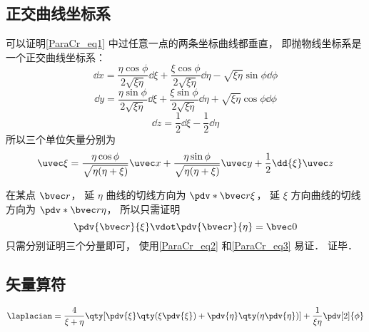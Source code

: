\subsection{正交曲线坐标系}
可以证明\autoref{ParaCr_eq1} 中过任意一点的两条坐标曲线都垂直， 即抛物线坐标系是一个正交曲线坐标系：
\begin{equation}
\dd{x} = \frac{\eta \cos\phi}{2\sqrt{\xi\eta}}\dd{\xi} + \frac{\xi \cos\phi}{2\sqrt{\xi\eta}}\dd{\eta} - \sqrt{\xi\eta}\sin\phi\dd{\phi}
\end{equation}
\begin{equation}
\dd{y} = \frac{\eta \sin\phi}{2\sqrt{\xi\eta}}\dd{\xi} + \frac{\xi \sin\phi}{2\sqrt{\xi\eta}}\dd{\eta} + \sqrt{\xi\eta}\cos\phi\dd{\phi}
\end{equation}
\begin{equation}
\dd{z} = \frac{1}{2}\dd{\xi} - \frac{1}{2}\dd{\eta}
\end{equation}
所以三个单位矢量分别为
\begin{equation}
\uvec \xi = \frac{\eta \cos\phi}{\sqrt{\eta(\eta+\xi)}}\uvec x + \frac{\eta \sin\phi}{\sqrt{\eta(\eta+\xi)}}\uvec y + \frac{1}{2}\dd{\xi}\uvec z
\end{equation}



在某点 $\bvec r$， 延 $\eta$ 曲线的切线方向为 $\pdv*{\bvec r}{\xi}$， 延 $\xi$ 方向曲线的切线方向为 $\pdv*{\bvec r}{\eta}$， 所以只需证明
\begin{equation}
\pdv{\bvec r}{\xi} \vdot \pdv{\bvec r}{\eta} = \bvec 0
\end{equation}
只需分别证明三个分量即可， 使用\autoref{ParaCr_eq2} 和\autoref{ParaCr_eq3} 易证． 证毕．

\subsection{矢量算符}
\begin{equation}
\laplacian = \frac{4}{\xi + \eta} \qty[\pdv{\xi}\qty(\xi\pdv{\xi}) + \pdv{\eta}\qty(\eta\pdv{\eta})] + \frac{1}{\xi\eta}\pdv[2]{\phi}
\end{equation}
